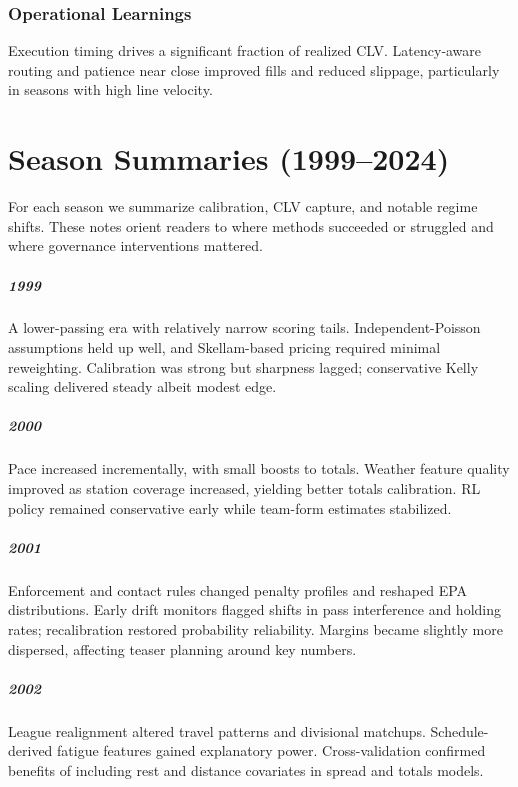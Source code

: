 \documentclass[12pt]{report}  %
\numberwithin{equation}{section}
\theoremstyle{plain}
\theoremstyle{definition}
\theoremstyle{remark}
\begin{document}
\subsection*{Operational Learnings}
Execution timing drives a significant fraction of realized CLV. Latency‑aware routing and patience near close improved fills and reduced slippage, particularly in seasons with high line velocity.

\fi

\chapter{Season Summaries (1999--2024)}\label{app:season-summaries}
For each season we summarize calibration, CLV capture, and notable regime shifts. These notes orient readers to where methods succeeded or struggled and where governance interventions mattered.


\paragraph{1999} A lower-passing era with relatively narrow scoring tails. Independent-Poisson assumptions held up well, and Skellam-based pricing required minimal reweighting. Calibration was strong but sharpness lagged; conservative Kelly scaling delivered steady albeit modest edge.

\paragraph{2000} Pace increased incrementally, with small boosts to totals. Weather feature quality improved as station coverage increased, yielding better totals calibration. RL policy remained conservative early while team-form estimates stabilized.

\paragraph{2001} Enforcement and contact rules changed penalty profiles and reshaped EPA distributions. Early drift monitors flagged shifts in pass interference and holding rates; recalibration restored probability reliability. Margins became slightly more dispersed, affecting teaser planning around key numbers.

\paragraph{2002} League realignment altered travel patterns and divisional matchups. Schedule-derived fatigue features gained explanatory power. Cross-validation confirmed benefits of including rest and distance covariates in spread and totals models.
\end{document}
